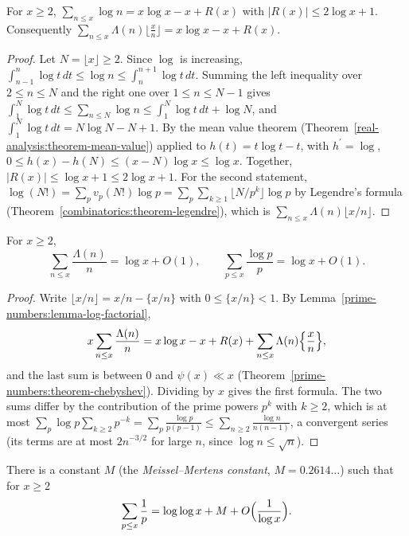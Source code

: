\begin{lemma}\label{prime-numbers:lemma-log-factorial}
For $x \geq 2$, $\sum_{n \leq x}\log n = x\log x - x + R(x)$ with $|R(x)| \leq 2\log x + 1$. Consequently $\sum_{n \leq x}\Lambda(n)\bigl\lfloor\frac{x}{n}\bigr\rfloor = x\log x - x + R(x)$.
\end{lemma}

\begin{proof}
Let $N = \lfloor x\rfloor \geq 2$. Since $\log$ is increasing, $\int_{n-1}^{n}\log t\,dt \leq \log n \leq \int_n^{n+1}\log t\,dt$. Summing the left inequality over $2 \leq n \leq N$ and the right one
over $1 \leq n \leq N - 1$ gives $\int_1^N\log t\,dt \leq \sum_{n \leq N}\log n \leq \int_1^N\log t\,dt + \log N$, and $\int_1^N\log t\,dt = N\log N - N + 1$. By the mean value theorem
(Theorem~\ref{real-analysis:theorem-mean-value}) applied to $h(t) = t\log t - t$, with $h^{\prime} = \log$, $0 \leq h(x) - h(N) \leq (x - N)\log x \leq \log x$. Together,
$|R(x)| \leq \log x + 1 \leq 2\log x + 1$. For the second statement,
$\log(N!) = \sum_pv_p(N!)\log p = \sum_p\sum_{k \geq 1}\lfloor N/p^k\rfloor\log p$ by Legendre's formula (Theorem~\ref{combinatorics:theorem-legendre}), which is $\sum_{n \leq x}\Lambda(n)\lfloor x/n\rfloor$.
\end{proof}

\begin{theorem}\label{prime-numbers:theorem-mertens-first}
For $x \geq 2$,
\[
\sum_{n \leq x}\frac{\Lambda(n)}{n} = \log x + O(1), \qquad \sum_{p \leq x}\frac{\log p}{p} = \log x + O(1).
\]
\end{theorem}

\begin{proof}
Write $\lfloor x/n\rfloor = x/n - \{x/n\}$ with $0 \leq \{x/n\} < 1$. By Lemma~\ref{prime-numbers:lemma-log-factorial},
\[
x\sum_{n \leq x}\frac{\Lambda(n)}{n} = x\log x - x + R(x) + \sum_{n \leq x}\Lambda(n)\Bigl\{\frac{x}{n}\Bigr\},
\]
and the last sum is between $0$ and $\psi(x) \ll x$ (Theorem~\ref{prime-numbers:theorem-chebyshev}). Dividing by $x$ gives the first formula. The two sums differ by the contribution of the
prime powers $p^k$ with $k \geq 2$, which is at most $\sum_p\log p\sum_{k \geq 2}p^{-k} = \sum_p\frac{\log p}{p(p - 1)} \leq \sum_{n \geq 2}\frac{\log n}{n(n - 1)}$, a convergent series
(its terms are at most $2n^{-3/2}$ for large $n$, since $\log n \leq \sqrt{n}$).
\end{proof}

\begin{theorem}\label{prime-numbers:theorem-mertens-second}
There is a constant $M$ (the \emph{Meissel--Mertens constant}, $M = 0.2614\ldots$) such that for $x \geq 2$
\[
\sum_{p \leq x}\frac1p = \log\log x + M + O\Bigl(\frac{1}{\log x}\Bigr).
\]
\end{theorem}

